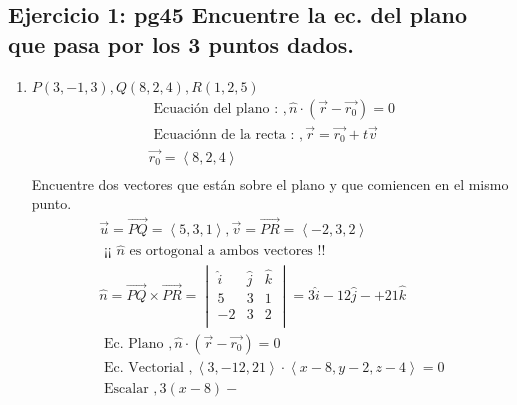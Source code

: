 \subsection{Ejercicio 1: pg45 Encuentre la ec. del plano que pasa por los 3 puntos dados.}
\begin{enumerate}
    \item $P(3,-1,3), Q(8,2,4), R(1,2,5)$
    \begin{align*}
        \text{  Ecuación del plano :   }, \hat{n} \cdot (\vec{r}- \vec{r_0}) = 0\\
        \text{  Ecuaciónn de la recta :   }, \vec{r} = \vec{r_0}+t \vec{v} \\ 
        \vec{r_0} = \left\langle 8,2,4 \right\rangle  \\ 
    \end{align*}
    Encuentre dos vectores que están sobre el plano y que comiencen en el mismo punto.
    \begin{align*}
        \vec{u}= \overrightarrow{PQ} = \left\langle 5,3,1  \right\rangle, \vec{v}= \overrightarrow{PR}= \left\langle -2,3,2 \right\rangle \\ 
        \text{  ¡¡ $\hat{n}$ es ortogonal a ambos vectores !! } \\ 
        \hat{n} = \overrightarrow{PQ} \times \overrightarrow{PR} = \begin{vmatrix}
            \hat{i}& \hat{j}& \hat{k} \\
            5 & 3 & 1 \\ 
            -2 & 3 & 2 \\   
        \end{vmatrix} = 3 \hat{i} - 12 \hat{j} -+ 21 \hat{k} \\ 
        \text{  Ec. Plano  }, \hat{n} \cdot ( \vec{r} - \vec{r_0}) = 0 \\ 
        \text{  Ec. Vectorial  }, \left\langle 3,-12,21 \right\rangle \cdot \left\langle x-8,y-2,z-4 \right\rangle = 0 \\ 
        \text{  Escalar  }, 3(x-8)-  
    \end{align*}


\end{enumerate}
